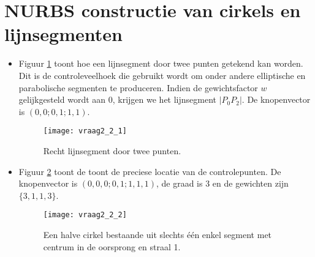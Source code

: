 \documentclass{report}
\begin{document}
\section{NURBS constructie van cirkels en lijnsegmenten  }
\begin{enumerate}
	{
		\begin{itemize} 
			\item Figuur \ref{fig:vraag2_2_1} toont hoe een lijnsegment door twee punten getekend kan worden. Dit is de controleveelhoek die gebruikt wordt om onder andere elliptische en parabolische segmenten te produceren. Indien de gewichtsfactor $w$ gelijkgesteld wordt aan 0, krijgen we het lijnsegment $|P_0P_2|$. De knopenvector is $(0, 0 ; 0, 1 ; 1, 1)$.
			\begin{figure}[ht]
				\centering
				\texttt{[image: vraag2\_2\_1]}
				\caption{Recht lijnsegment door twee punten.}
				\label{fig:vraag2_2_1}
			\end{figure}
		\end{itemize}}
			
	{
		\begin{itemize} 
		\item Figuur \ref{fig:vraag2_2_2} toont de toont de preciese locatie van de controlepunten. De knopenvector is $(0, 0, 0; 0 , 1; 1, 1, 1)$, de graad is 3 en de gewichten zijn $\{3, 1, 1, 3\}$.
		\begin{figure}[ht]
			\centering
			\texttt{[image: vraag2\_2\_2]}
			\caption{Een halve cirkel bestaande uit slechts één enkel segment met centrum in de oorsprong en straal 1.}
			\label{fig:vraag2_2_2}
		\end{figure}
		\end{itemize}
	}
			

\end{enumerate}
\end{document}
